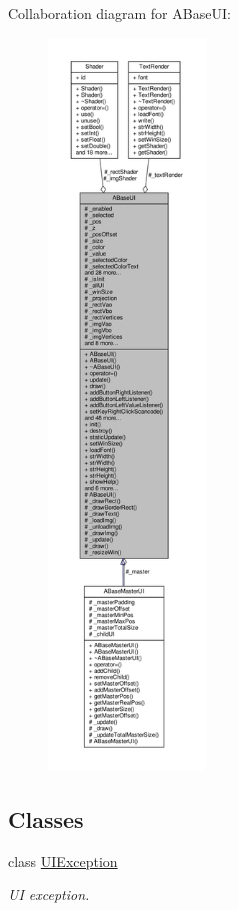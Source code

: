 Collaboration diagram for A\+Base\+UI\+:
\nopagebreak
\begin{figure}[H]
\begin{center}
\leavevmode
\includegraphics[height=550pt]{class_a_base_u_i__coll__graph}
\end{center}
\end{figure}
\subsection*{Classes}
\begin{DoxyCompactItemize}
\item 
class \hyperlink{class_a_base_u_i_1_1_u_i_exception}{U\+I\+Exception}
\begin{DoxyCompactList}\small\item\em UI exception. \end{DoxyCompactList}\end{DoxyCompactItemize}
